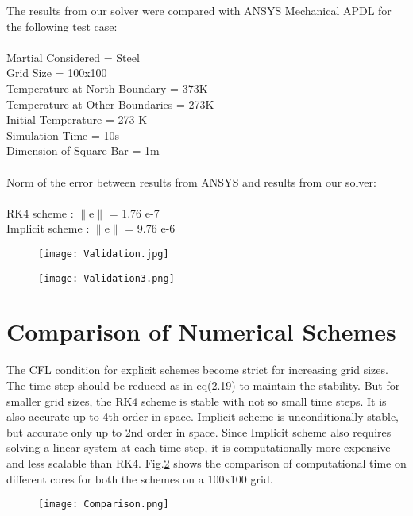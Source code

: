 \documentclass[10pt,a4paper]{report}
\begin{document}
The results from our solver were compared with ANSYS Mechanical APDL for the following test case:\\
\\
Martial Considered =  Steel\\
Grid Size = 100x100\\
Temperature at North Boundary = 373K\\
Temperature at Other Boundaries = 273K\\
Initial Temperature = 273 K\\
Simulation Time = 10s\\
Dimension of Square Bar = 1m\\
\\
Norm of the error between results from ANSYS and results from our solver:\\
\\
RK4 scheme : $\parallel$e$\parallel$  = 1.76 e-7\\
Implicit scheme : $\parallel$e$\parallel$  = 9.76 e-6\\

\begin{figure}[H]
\begin{minipage}[t]{0.5\linewidth}
\centering
\texttt{[image: Validation.jpg]}
\caption{}
\label{fig:side:a}
\end{minipage}%
\begin{minipage}[t]{0.5\linewidth}
\centering
\texttt{[image: Validation3.png]}
\caption{}
\label{fig:side:b}
\end{minipage}
\end{figure}



\section{Comparison of Numerical Schemes}

The CFL condition for explicit schemes become strict for increasing grid sizes. The time step should be reduced as in eq(2.19) to maintain the stability. But for smaller grid sizes,  the RK4 scheme is stable with not so small time steps. It is also accurate up to 4th order in space. Implicit scheme is unconditionally stable, but accurate only up to 2nd order in space.  Since Implicit scheme also requires solving a linear system at each time step, it is computationally more expensive and less scalable than RK4. Fig.\ref{fig:comparison} shows the comparison of computational time on different cores for both the schemes on a 100x100 grid.
\begin{figure}[H]
\begin{center}
\texttt{[image: Comparison.png]} 
\caption{}
\label{fig:comparison}
\end{center}
\end{figure}
\end{document}
